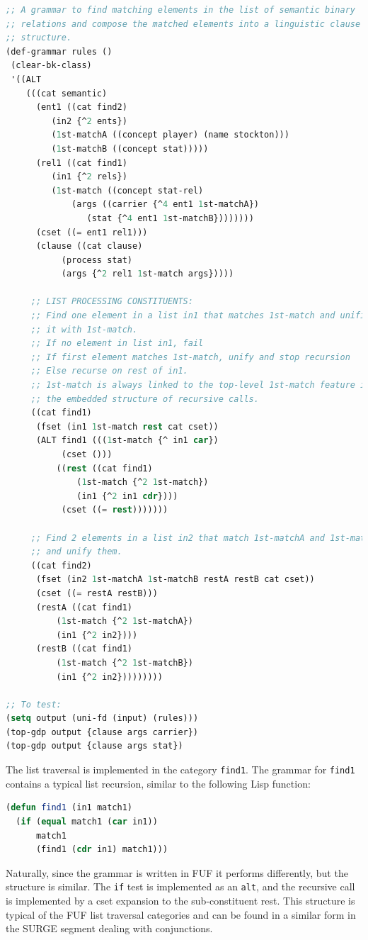 \documentclass[10pt,a4paper]{report}
\begin{document}
\begin{lstlisting}[language=Lisp]
;; A grammar to find matching elements in the list of semantic binary
;; relations and compose the matched elements into a linguistic clause
;; structure. 
(def-grammar rules ()
 (clear-bk-class)
 '((ALT
    (((cat semantic)
      (ent1 ((cat find2)
	     (in2 {^2 ents})
	     (1st-matchA ((concept player) (name stockton)))
	     (1st-matchB ((concept stat)))))
      (rel1 ((cat find1)
	     (in1 {^2 rels})
	     (1st-match ((concept stat-rel)
			 (args ((carrier {^4 ent1 1st-matchA})
				(stat {^4 ent1 1st-matchB})))))))
      (cset ((= ent1 rel1)))
      (clause ((cat clause)
	       (process stat)
	       (args {^2 rel1 1st-match args}))))

     ;; LIST PROCESSING CONSTITUENTS:
     ;; Find one element in a list in1 that matches 1st-match and unifies
     ;; it with 1st-match.
     ;; If no element in list in1, fail
     ;; If first element matches 1st-match, unify and stop recursion
     ;; Else recurse on rest of in1.
     ;; 1st-match is always linked to the top-level 1st-match feature in
     ;; the embedded structure of recursive calls.
     ((cat find1)
      (fset (in1 1st-match rest cat cset))
      (ALT find1 (((1st-match {^ in1 car})
		   (cset ()))
		  ((rest ((cat find1)
			  (1st-match {^2 1st-match})
			  (in1 {^2 in1 cdr})))
		   (cset ((= rest)))))))

     ;; Find 2 elements in a list in2 that match 1st-matchA and 1st-matchB
     ;; and unify them.
     ((cat find2)
      (fset (in2 1st-matchA 1st-matchB restA restB cat cset))
      (cset ((= restA restB)))
      (restA ((cat find1) 
	      (1st-match {^2 1st-matchA})
	      (in1 {^2 in2})))
      (restB ((cat find1) 
	      (1st-match {^2 1st-matchB})
	      (in1 {^2 in2}))))))))

;; To test:
(setq output (uni-fd (input) (rules)))
(top-gdp output {clause args carrier})
(top-gdp output {clause args stat})
\end{lstlisting}

The list traversal is implemented in the category {\tt find1}.  The grammar
for {\tt find1} contains a typical list recursion, similar to the following
Lisp function:

\begin{lstlisting}[language=Lisp]
(defun find1 (in1 match1)
  (if (equal match1 (car in1))
      match1
      (find1 (cdr in1) match1)))
\end{lstlisting}

Naturally, since the grammar is written in FUF it performs differently, but
the structure is similar.  The {\tt if} test is implemented as an {\tt alt},
and the recursive call is implemented by a cset expansion to the
sub-constituent rest.  This structure is typical of the FUF list traversal
categories and can be found in a similar form in the SURGE segment dealing
with conjunctions.  
\end{document}
